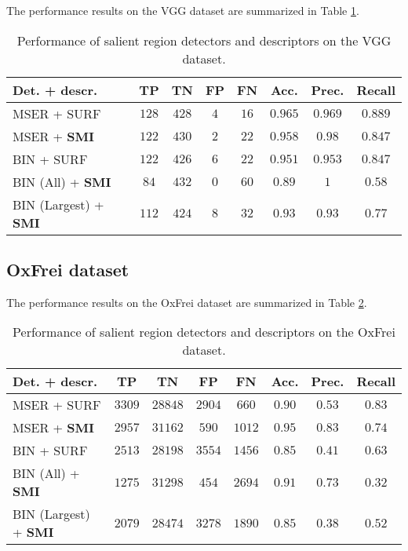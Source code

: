 \documentclass[a4paper,11pt]{article}
\begin{document}
The performance results on the VGG dataset are summarized in Table \ref{tab:vgg}.
\begin{table}[!ht]
\begin{center}
\begin{tabular}{|l||c|c|c|c|c|c|c|}

\hline
Det. + descr. & TP & TN & FP & FN & Acc. &Prec. &Recall\\
\hline
\hline
MSER + SURF & $128$ & $428$ &$4$ & $16$ & $0.965$ & $0.969$ & $0.889$\\
\hline
MSER + \bf{SMI} & $122$ &$430$  &$2$  &$22$  &$0.958$  & $0.98$ & $0.847$\\
\hline
BIN + SURF & $122$ & $426$ & $6$ & $22$ & $0.951$ & $0.953$ &$0.847$\\
\hline
BIN (All) + \bf{SMI} &$84$  &$432$  &$0$  &$60$ &$0.89$  & $1$ &$0.58$ \\
\hline
BIN (Largest) + \bf{SMI} &$112$  &$424$  &$8$  &$32$ &$0.93$  & $0.93$ &$0.77$ \\
\hline
\end{tabular}
\end{center}
\vspace{-20pt}
\caption{Performance of salient region detectors and descriptors on the VGG dataset.} \label{tab:vgg}
  \vspace{-10pt}
\end{table}

\subsection{OxFrei dataset}

The performance results on the OxFrei dataset are summarized in Table \ref{tab:oxfrei}.
\begin{table}[!ht]
\begin{center}
\begin{tabular}{|l||c|c|c|c|c|c|c|}

\hline
Det. + descr. & TP & TN & FP & FN & Acc. &Prec. &Recall\\
\hline
\hline
MSER + SURF & $3309$ & $28848$ & $2904$ & $660$ & $0.90$ & $0.53$ & $0.83$\\
\hline
MSER + \bf{SMI} & $2957$ & $31162$ & $590$ & $1012$ & $0.95$ &$0.83$ & $0.74$\\
\hline
BIN + SURF & $2513$ & $28198$ & $3554$ & $1456$ & $0.85$ &$0.41$ & $0.63$\\
\hline
BIN (All) + \bf{SMI}  & $1275$ & $31298$ & $454$ & $2694$ & $0.91$ &$0.73$ & $0.32$\\
\hline
BIN (Largest) + \bf{SMI}  & $2079$& $28474$ & $3278$ & $1890$ & $0.85$ & $0.38$ & $0.52$\\
\hline
\end{tabular}
\end{center}
\vspace{-20pt}
\caption{Performance of salient region detectors and descriptors on the OxFrei dataset.} \label{tab:oxfrei}
  \vspace{-10pt}
\end{table}
\end{document}
